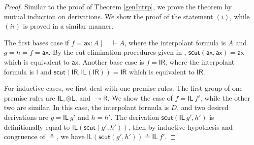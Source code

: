 \documentclass[sn-mathphys-num]{sn-jnl}%
\newcommand{\vd}{\vdash}
\newcommand{\tl}{\otimes \mathsf{L}}
\newcommand{\unitl}{\mathsf{IL}}
\newcommand{\unitr}{\mathsf{IR}}
\newcommand{\ax}{\mathsf{ax}}
\newcommand{\lolli}{\multimap}
\newcommand{\lright}{{\lolli}\mathsf{R}}
\newcommand{\unit}{\mathsf{I}}
\newcommand{\mf}[1]{\mathsf{#1}}
\theoremstyle{thmstyleone}%
\theoremstyle{thmstyletwo}%
\theoremstyle{thmstylethree}%
\begin{document}
\begin{proof}
Similar to the proof of Theorem \ref{genIntrp}, we prove the theorem by mutual induction on derivations.
We show the proof of the statement $(i)$, while $(ii)$ is proved in a similar manner.

The first bases case if $f = \ax : A \mid \quad \vd A$, where the interpolant formula is $A$ and $g = h = f = \ax$. By the cut-elimination procedures given in \cite{UVW:protsn,wan2024}, $\mf{scut} (\ax , \ax) = \ax$ which is equivalent to $\ax$.
Another base case is $f = \unitr$, where the interpolant formula is $\unit$ and $\mf{scut} (\unitr , \unitl (\unitr)) = \unitr$ which is equivalent to $\unitr$.

For inductive cases, we first deal with one-premise rules.
The first group of one-premise rules are $\unitl, \tl$, and $\lright$.
We show the case of $f = \unitl \ f'$, while the other two are similar.
In this case, the interpolant formula is $D$, and two desired derivations are $g = \unitl \ g'$ and $h = h'$.
The derivation $\mf{scut} (\unitl \ g', h')$ is definitionally equal to $\unitl (\mf{scut} (g' , h'))$, then by inductive hypothesis and congruence of $\circeq$, we have $\unitl (\mf{scut} (g' , h')) \circeq \unitl \ f'$.


\end{proof}
\end{document}
